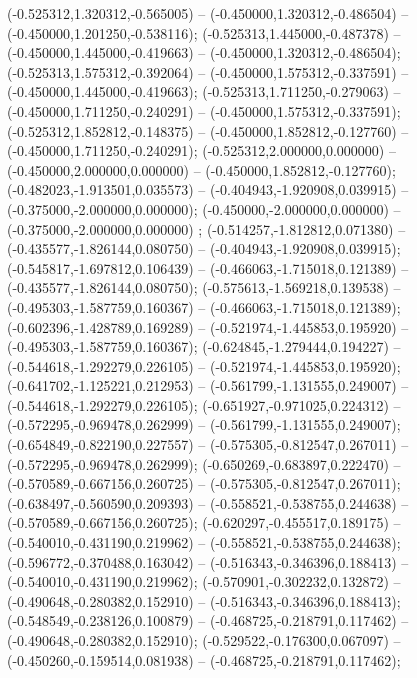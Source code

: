  (-0.525312,1.320312,-0.565005) -- (-0.450000,1.320312,-0.486504) -- (-0.450000,1.201250,-0.538116);
 (-0.525313,1.445000,-0.487378) -- (-0.450000,1.445000,-0.419663) -- (-0.450000,1.320312,-0.486504);
 (-0.525313,1.575312,-0.392064) -- (-0.450000,1.575312,-0.337591) -- (-0.450000,1.445000,-0.419663);
 (-0.525313,1.711250,-0.279063) -- (-0.450000,1.711250,-0.240291) -- (-0.450000,1.575312,-0.337591);
 (-0.525312,1.852812,-0.148375) -- (-0.450000,1.852812,-0.127760) -- (-0.450000,1.711250,-0.240291);
 (-0.525312,2.000000,0.000000) -- (-0.450000,2.000000,0.000000) -- (-0.450000,1.852812,-0.127760);
 (-0.482023,-1.913501,0.035573) -- (-0.404943,-1.920908,0.039915) -- (-0.375000,-2.000000,0.000000);
 (-0.450000,-2.000000,0.000000) -- (-0.375000,-2.000000,0.000000) ;
 (-0.514257,-1.812812,0.071380) -- (-0.435577,-1.826144,0.080750) -- (-0.404943,-1.920908,0.039915);
 (-0.545817,-1.697812,0.106439) -- (-0.466063,-1.715018,0.121389) -- (-0.435577,-1.826144,0.080750);
 (-0.575613,-1.569218,0.139538) -- (-0.495303,-1.587759,0.160367) -- (-0.466063,-1.715018,0.121389);
 (-0.602396,-1.428789,0.169289) -- (-0.521974,-1.445853,0.195920) -- (-0.495303,-1.587759,0.160367);
 (-0.624845,-1.279444,0.194227) -- (-0.544618,-1.292279,0.226105) -- (-0.521974,-1.445853,0.195920);
 (-0.641702,-1.125221,0.212953) -- (-0.561799,-1.131555,0.249007) -- (-0.544618,-1.292279,0.226105);
 (-0.651927,-0.971025,0.224312) -- (-0.572295,-0.969478,0.262999) -- (-0.561799,-1.131555,0.249007);
 (-0.654849,-0.822190,0.227557) -- (-0.575305,-0.812547,0.267011) -- (-0.572295,-0.969478,0.262999);
 (-0.650269,-0.683897,0.222470) -- (-0.570589,-0.667156,0.260725) -- (-0.575305,-0.812547,0.267011);
 (-0.638497,-0.560590,0.209393) -- (-0.558521,-0.538755,0.244638) -- (-0.570589,-0.667156,0.260725);
 (-0.620297,-0.455517,0.189175) -- (-0.540010,-0.431190,0.219962) -- (-0.558521,-0.538755,0.244638);
 (-0.596772,-0.370488,0.163042) -- (-0.516343,-0.346396,0.188413) -- (-0.540010,-0.431190,0.219962);
 (-0.570901,-0.302232,0.132872) -- (-0.490648,-0.280382,0.152910) -- (-0.516343,-0.346396,0.188413);
 (-0.548549,-0.238126,0.100879) -- (-0.468725,-0.218791,0.117462) -- (-0.490648,-0.280382,0.152910);
 (-0.529522,-0.176300,0.067097) -- (-0.450260,-0.159514,0.081938) -- (-0.468725,-0.218791,0.117462);
